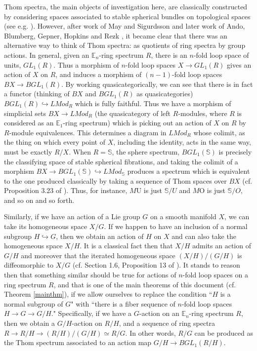 \documentclass{article}
\theoremstyle{definition}
\theoremstyle{plain}
\newcommand{\sph}{\mathbb{S}}
\newcommand{\E}{\mathbb{E}}
\newcommand{\MO}{M\mathrm{O}}
\newcommand{\MU}{M\mathrm{U}}
\begin{document}
Thom spectra, the main objects of investigation here, are classically constructed by considering spaces associated to stable spherical bundles on topological spaces (see e.g. \cite{sullonthom}). However, after work of May and Sigurdsson \cite{maysig} and later work of Ando, Blumberg, Gepner, Hopkins and Rezk \cite{abghr}, it became clear that there was an alternative way to think of Thom spectra: as quotients of ring spectra by group actions. In general, given an $\E_{n}$-ring spectrum $R$, there is an $n$-fold loop space of units, $GL_1(R)$. Thus a morphism of $n$-fold loop spaces $X\to GL_1(R)$ gives an action of $X$ on $R$, and induces a morphism of $(n-1)$-fold loop spaces $BX\to BGL_1(R)$. By working quasicategorically, we can see that there is in fact a functor (thinking of $BX$ and $BGL_1(R)$ as quasicategories) $BGL_1(R)\hookrightarrow LMod_R$ which is fully faithful. Thus we have a morphism of simplicial sets $BX\to LMod_R$ (the quasicategory of left $R$-modules, where $R$ is considered as an $\E_1$-ring spectrum) which is picking out an action of $X$ on $R$ by $R$-module equivalences. This determines a diagram in $LMod_R$ whose colimit, as the thing on which every point of $X$, including the identity, acts in the same way, must be exactly $R/X$.  When $R=\sph$, the sphere spectrum, $BGL_1(\sph)$ is precisely the classifying space of stable spherical fibrations, and taking the colimit of a morphism $BX\to BGL_1(\sph)\hookrightarrow LMod_{\sph}$ produces a spectrum which is equivalent to the one produced classically by taking a sequence of Thom spaces over $BX$ (cf. Proposition 3.23 of \cite{abghr}). Thus, for instance, $\MU$ is just $\sph/U$ and $\MO$ is just $\sph/O$, and so on and so forth. 

Similarly, if we have an action of a Lie group $G$ on a smooth manifold $X$, we can take its homogeneous space $X/G$. If we happen to have an inclusion of a normal subgroup $H\hookrightarrow G$, then we obtain an action of $H$ on $X$ and can also take the homogeneous space $X/H$. It is a classical fact then that $X/H$ admits an action of $G/H$ and moreover that the iterated homogeneous space $(X/H)/(G/H)$ is diffeomorphic to $X/G$ (cf. Section 1.6, Proposition 13 of \cite{bourblie}). It stands to reason then that something similar should be true for actions of $n$-fold loop spaces on a ring spectrum $R$, and that is one of the main theorems of this document (cf. Theorem \ref{mainthm}), if we allow ourselves to replace the condition ``$H$ is a normal subgroup of $G$" with ``there is a fiber sequence of $n$-fold loop spaces $H\to G\to G/H$." Specifically, if we have a $G$-action on an $\E_n$-ring spectrum $R$, then we obtain a $G/H$-action on $R/H$, and a sequence of ring spectra $R\to R/H\to (R/H)/(G/H)\simeq R/G$. In other words, $R/G$ can be produced as the Thom spectrum associated to an action map $G/H\to BGL_1(R/H)$. 
\end{document}
